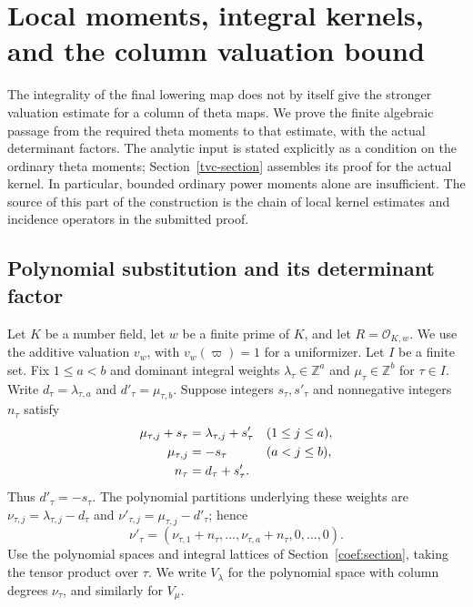 \section{Local moments, integral kernels, and the column valuation bound}
\label{cv-section}

The integrality of the final lowering map does not by itself give the
stronger valuation estimate for a column of theta maps.  We prove the
finite algebraic passage from the required theta moments to that
estimate, with the actual determinant factors. The analytic input
is stated explicitly as a condition on the ordinary theta moments;
Section~\ref{tvc-section} assembles its proof for the actual kernel.
In particular, bounded ordinary power moments alone are insufficient.
The source of this part of the construction is the chain of local
kernel estimates and incidence operators in the submitted proof.
\cite{alpo-uniform-source}

\subsection{Polynomial substitution and its determinant factor}

Let $K$ be a number field, let $w$ be a finite prime of $K$, and let
$R=\mathcal O_{K,w}$.  We use the additive valuation $v_w$, with
$v_w(\varpi)=1$ for a uniformizer.  Let $I$ be a finite set.  Fix
$1\le a<b$ and dominant integral weights
$\lambda_\tau\in\mathbb Z^a$ and $\mu_\tau\in\mathbb Z^b$ for
$\tau\in I$.  Write $d_\tau=\lambda_{\tau,a}$ and
$d'_\tau=\mu_{\tau,b}$.  Suppose integers $s_\tau,s'_\tau$ and
nonnegative integers $n_\tau$ satisfy
\begin{align}
 \mu_{\tau,j}+s_\tau&=\lambda_{\tau,j}+s'_\tau
                  &&(1\le j\le a),\label{cv-weight-compatibility}\\
 \mu_{\tau,j}&=-s_\tau&&(a<j\le b),\notag\\
 n_\tau&=d_\tau+s'_\tau.\notag
\end{align}
Thus $d'_\tau=-s_\tau$.  The polynomial partitions underlying these
weights are $\nu_{\tau,j}=\lambda_{\tau,j}-d_\tau$ and
$\nu'_{\tau,j}=\mu_{\tau,j}-d'_\tau$; hence
\[
 \nu'_\tau=(\nu_{\tau,1}+n_\tau,\ldots,
              \nu_{\tau,a}+n_\tau,0,\ldots,0).
 \tag{CV1}
\]
Use the polynomial spaces and integral lattices of
Section~\ref{coef:section}, taking the tensor product over $\tau$.
We write $V_\lambda$ for the polynomial space with column degrees
$\nu_\tau$, and similarly for $V_\mu$.

